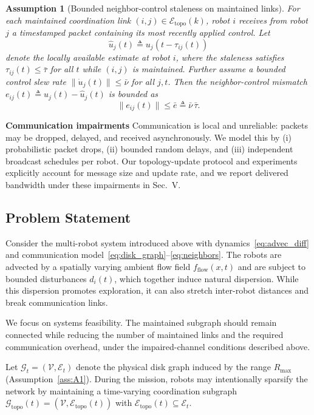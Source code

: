 \documentclass[conference]{IEEEconf}
\theoremstyle{plain}
\newtheorem{assumption}{Assumption}
\begin{document}
\begin{assumption}[Bounded neighbor-control staleness on maintained links]
\label{ass:A3}
For each maintained coordination link $(i,j)\in\mathcal{E}_{\mathrm{topo}}(k)$, robot $i$ receives from robot $j$ a timestamped packet containing its most recently applied control. Let
\[
\hat u_j(t)\triangleq u_j(t-\tau_{ij}(t))
\]
denote the locally available estimate at robot $i$, where the staleness satisfies $\tau_{ij}(t)\le \bar\tau$ for all $t$ while $(i,j)$ is maintained.
Further assume a bounded control slew rate $\|\dot u_j(t)\|\le \bar\nu$ for all $j,t$. Then the neighbor-control mismatch
$e_{ij}(t)\triangleq u_j(t)-\hat u_j(t)$ is bounded as
\[
\|e_{ij}(t)\|\le \bar e \triangleq \bar\nu\,\bar\tau.
\]
\end{assumption}

\noindent\textbf{Communication impairments}
Communication is local and unreliable: packets may be dropped, delayed, and received asynchronously. We model this by (i) probabilistic packet drops, (ii) bounded random delays, and (iii) independent broadcast schedules per robot.
Our topology-update protocol and experiments explicitly account for message size and update rate, and we report delivered bandwidth under these impairments in Sec.~V.

\subsection{Problem Statement}
\label{subsec:problem_statement}

Consider the multi-robot system introduced above with dynamics~\eqref{eq:advec_diff} and communication model~\eqref{eq:disk_graph}--\eqref{eq:neighbors}. The robots are advected by a spatially varying ambient flow field $f_{\text{flow}}(x,t)$ and are subject to bounded disturbances $d_i(t)$, which together induce natural dispersion. While this dispersion promotes exploration, it can also stretch inter-robot distances and break communication links.

We focus on systems feasibility. The maintained subgraph should remain connected while reducing the number of maintained links and the required communication overhead, under the impaired-channel conditions described above.

Let $\mathcal{G}_t=(\mathcal{V},\mathcal{E}_t)$ denote the physical disk graph induced by the range $R_{\max}$ (Assumption~\ref{ass:A1}). During the mission, robots may intentionally sparsify the network by maintaining a time-varying coordination subgraph $\mathcal{G}_{\mathrm{topo}}(t)=(\mathcal{V},\mathcal{E}_{\mathrm{topo}}(t))$ with $\mathcal{E}_{\mathrm{topo}}(t)\subseteq \mathcal{E}_t$.
\end{document}
